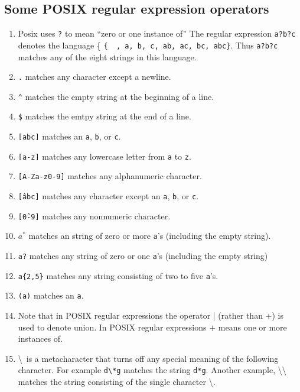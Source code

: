 \documentclass[]{article}
\begin{document}
  \subsection*{Some POSIX regular expression operators}
    \begin{enumerate}
      \item Posix uses \texttt{?} to mean ``zero or one instance of'' The
            regular expression \texttt{a?b?c} denotes the language \{
            \texttt{\{\textepsilon \, , a, b, c, ab, ac, bc, abc\}}. Thus
            \texttt{a?b?c} matches any of the eight strings in this language.
      \item \texttt{.} matches any character except a newline.
      \item \texttt{\^} matches the empty string at the beginning of a line.
      \item \texttt{\$} matches the emtpy string at the end of a line.
      \item \texttt{[abc]} matches an \texttt{a}, \texttt{b}, or \texttt{c}.
      \item \texttt{[a-z]} matches any lowercase letter from \texttt{a} to
            \texttt{z}.
      \item \texttt{[A-Za-z0-9]} matches any alphanumeric character.
      \item \texttt{[\^abc]} matches any character except an \texttt{a},
            \texttt{b}, or \texttt{c}.
      \item \texttt{[\^0-9]} matches any nonnumeric character.
      \item \texttt{$a^*$} matches an string of zero or more \texttt{a}'s
            (including the empty string).
      \item \texttt{a?} matches any string of zero or one \texttt{a}'s
            (including the empty string)
      \item \texttt{a\{2,5\}} matches any string consisting of two to five
            \texttt{a}'s.
      \item \texttt{(a)} matches an \texttt{a}.
      \item Note that in POSIX regular expressions the operator | (rather than
            $+$) is used to denote union. In POSIX regular expressions $+$ means
            one or more instances of.
      \item \textbackslash \, is a metacharacter that turns off any special
            meaning of the following character. For example
            \texttt{d\textbackslash{}*g} matches the string \texttt{d*g}.
            Another example, \textbackslash\textbackslash \, matches the string
            consisting of the single character \textbackslash.
    \end{enumerate}
\end{document}

